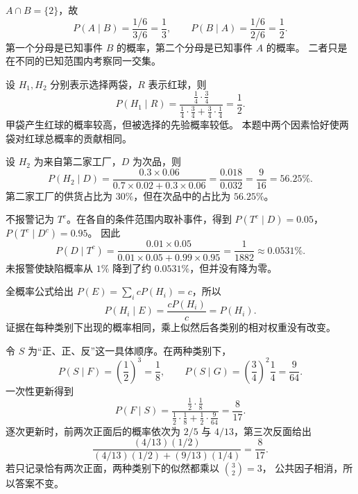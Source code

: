 \documentclass[UTF8,12pt,a4paper,fontset=fandol]{ctexart}
\begin{document}
\begin{solve}
$A\cap B=\{2\}$，故
\[
  P(A\mid B)=\frac{1/6}{3/6}=\frac13,
  \qquad P(B\mid A)=\frac{1/6}{2/6}=\frac12.
\]
第一个分母是已知事件 $B$ 的概率，第二个分母是已知事件 $A$ 的概率。
二者只是在不同的已知范围内考察同一交集。
\end{solve}

\begin{solve}
设 $H_1,H_2$ 分别表示选择两袋，$R$ 表示红球，则
\[
  P(H_1\mid R)
  =\frac{\frac14\cdot\frac34}
  {\frac14\cdot\frac34+\frac34\cdot\frac14}=\frac12.
\]
甲袋产生红球的概率较高，但被选择的先验概率较低。
本题中两个因素恰好使两袋对红球总概率的贡献相同。
\end{solve}

\begin{solve}
设 $H_2$ 为来自第二家工厂，$D$ 为次品，则
\[
  P(H_2\mid D)
  =\frac{0.3\times0.06}{0.7\times0.02+0.3\times0.06}
  =\frac{0.018}{0.032}=\frac9{16}=56.25\%.
\]
第二家工厂的供货占比为 $30\%$，但在次品中的占比为 $56.25\%$。
\end{solve}

\begin{solve}
不报警记为 $T^c$。在各自的条件范围内取补事件，得到
$P(T^c\mid D)=0.05$，$P(T^c\mid D^c)=0.95$。
因此
\[
  P(D\mid T^c)
  =\frac{0.01\times0.05}{0.01\times0.05+0.99\times0.95}
  =\frac1{1882}\approx0.0531\%.
\]
未报警使缺陷概率从 $1\%$ 降到了约 $0.0531\%$，但并没有降为零。
\end{solve}

\begin{solve}
全概率公式给出 $P(E)=\sum_i cP(H_i)=c$，所以
\[
  P(H_i\mid E)=\frac{cP(H_i)}{c}=P(H_i).
\]
证据在每种类别下出现的概率相同，乘上似然后各类别的相对权重没有改变。
\end{solve}

\begin{solve}
令 $S$ 为“正、正、反”这一具体顺序。在两种类别下，
\[
  P(S\mid F)=\left(\frac12\right)^3=\frac18,
  \qquad P(S\mid G)=\left(\frac34\right)^2\frac14=\frac9{64}.
\]
一次性更新得到
\[
  P(F\mid S)=\frac{\frac12\cdot\frac18}
  {\frac12\cdot\frac18+\frac12\cdot\frac9{64}}=\frac8{17}.
\]
逐次更新时，前两次正面后的概率依次为 $2/5$ 与 $4/13$，第三次反面给出
\[
  \frac{(4/13)(1/2)}{(4/13)(1/2)+(9/13)(1/4)}=\frac8{17}.
\]
若只记录恰有两次正面，两种类别下的似然都乘以 $\binom32=3$，
公共因子相消，所以答案不变。
\end{solve}
\end{document}
